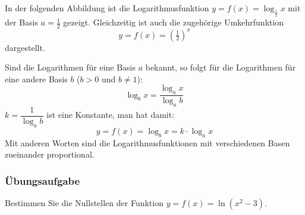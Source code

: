In der folgenden Abbildung ist die Logarithmusfunktion $y = f(x) = \log_{\frac{1}{2}} x$ mit der Basis $a = \tfrac{1}{2}$ gezeigt. Gleichzeitig ist auch die zugehörige Umkehrfunktion
\[ y = f(x) = \left(\tfrac{1}{2}\right)^x \]
dargestellt.

\begin{center}
\end{center}

Sind die Logarithmen für eine Basis $a$ bekannt, so folgt für die Logarithmen für eine andere Basis $b$ ($b > 0$ und $b \neq 1$):
\[ \log_b x = \frac{\log_a x}{\log_a b} \]
$k = \dfrac{1}{\log_a b}$ ist eine Konstante, man hat damit:
\[ y = f(x) = \log_b x = k \cdot \log_a x \]
Mit anderen Worten sind die Logarithmusfunktionen mit verschiedenen Basen zueinander proportional.

\subsubsection{Übungsaufgabe}

\begin{graukasten}
  Bestimmen Sie die Nullstellen der Funktion $y = f(x) = \ln(x^2 - 3)$.
\end{graukasten}
